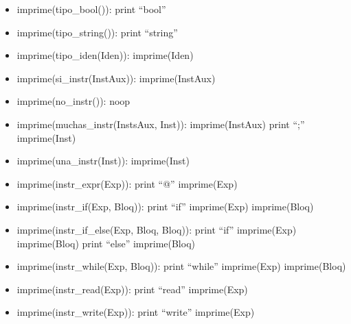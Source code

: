 \documentclass[11pt]{article}
\begin{document}
\begin{itemize}
            \item imprime(tipo\_bool()):
                \subitem print “bool”
            
            \item imprime(tipo\_string()):
                \subitem print “string”
            
            \item imprime(tipo\_iden(Iden)):
                \subitem imprime(Iden)
            
            \item imprime(si\_instr(InstAux)):
                \subitem imprime(InstAux)
            
            \item imprime(no\_instr()): noop
            
            \item imprime(muchas\_instr(InstsAux, Inst)):
                \subitem imprime(InstAux)
                \subitem print “;”
                \subitem imprime(Inst)
            
            \item imprime(una\_instr(Inst)):
                \subitem imprime(Inst)
            
            \item imprime(instr\_expr(Exp)):
                \subitem print “@”
                \subitem imprime(Exp)
            
            \item imprime(instr\_if(Exp, Bloq)):
                \subitem print “if”
                \subitem imprime(Exp)
                \subitem imprime(Bloq)
            
            \item imprime(instr\_if\_else(Exp, Bloq, Bloq)):
                \subitem print “if”
                \subitem imprime(Exp)
                \subitem imprime(Bloq)
                \subitem print “else”
                \subitem imprime(Bloq)
            
            \item imprime(instr\_while(Exp, Bloq)):
                \subitem print “while”
                \subitem imprime(Exp)
                \subitem imprime(Bloq)
            
            \item imprime(instr\_read(Exp)):
                \subitem print “read”
                \subitem imprime(Exp)
            
            \item imprime(instr\_write(Exp)):
                \subitem print “write”
                \subitem imprime(Exp)
            

\end{itemize}
\end{document}
